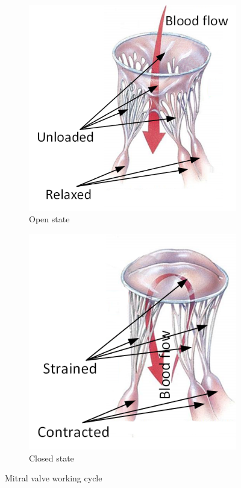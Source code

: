 \begin{figure}[H]\label{fig:workingMT}
  \centering
  \begin{subfigure}[H]{0.45\columnwidth}\label{fig:openMT}
    \includegraphics[width=\columnwidth]{./fig/openMT.png}
    \caption{Open state}
  \end{subfigure}
  \begin{subfigure}[H]{0.4\columnwidth}\label{fig:closedMT}
    \includegraphics[width=\columnwidth]{./fig/closedMT.png}
    \caption{Closed state}
  \end{subfigure}
  \caption{Mitral valve working cycle}
\end{figure}
